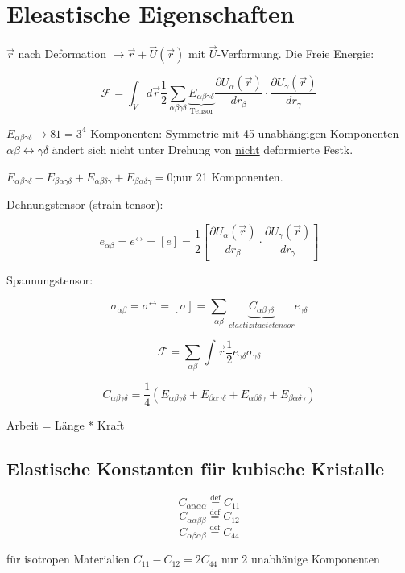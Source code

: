 \chapter{Eleastische Eigenschaften}


\(\vec r \) nach Deformation \(\rightarrow \vec r + \vec U(\vec r)\) mit \(\vec U\)-Verformung.
Die Freie Energie:

\[ \mathcal F = \int_V d\vec r \frac 1 2 \sum_{\alpha
  \beta\gamma\delta}\underbrace{E_{\alpha
    \beta\gamma\delta}}_{\text{Tensor}}\frac{\partial U_\alpha(\vec
  r)}{dr_\beta}\cdot
\frac{\partial U_\gamma(\vec r)}{dr_\gamma} \]

\(E_{\alpha\beta\gamma\delta}\rightarrow 81= 3^4 \) Komponenten:
Symmetrie mit 45 unabhängigen Komponenten \(\alpha\beta \leftrightarrow
\gamma\delta\) ändert sich nicht unter Drehung von \underline{nicht}
deformierte Festk.

\(E_{\alpha\beta\gamma\delta}-E_{\beta\alpha\gamma\delta}+E_{\alpha\beta\delta\gamma}+E_{\beta\alpha\delta\gamma}=0\);nur 21 Komponenten.

Dehnungstensor (strain tensor): 

\[e_{\alpha\beta}= e^{\leftrightarrow} = [e] = \frac 1 2 [\frac {\partial U_\alpha(\vec
  r)}{dr_\beta}\cdot \frac{\partial U_\gamma(\vec r)}{dr_\gamma}] 
\]

Spannungstensor: 

\[ \sigma_{\alpha\beta} = \sigma^\leftrightarrow = [\sigma] =
\sum_{\alpha\beta}
\underbrace{C_{\alpha\beta\gamma\delta}}_{elastizitaetstensor}e_{\gamma\delta} \]

\[ \mathcal F = \sum_{\alpha\beta}\int \vec r \frac 1 2
e_{\gamma\delta} \sigma_{\gamma\delta}\]

\[ C_{\alpha\beta\gamma\delta} = \frac 1
4(E_{\alpha\beta\gamma\delta}+E_{\beta\alpha\gamma\delta}+E_{\alpha\beta\delta\gamma}+E_{\beta\alpha\delta\gamma}) 
\]

Arbeit = Länge * Kraft

\section{Elastische Konstanten für kubische Kristalle}

\[ C_{\alpha\alpha\alpha\alpha} \stackrel{\mathrm{def}}= C_{11} \]
\[ C_{\alpha\alpha\beta\beta} \stackrel{\mathrm{def}}= C_{12} \]
\[ C_{\alpha\beta\alpha\beta} \stackrel{\mathrm{def}}= C_{44} \]

für isotropen Materialien \(C_{11}-C_{12}=2C_{44}\) nur 2 unabhänige
Komponenten

